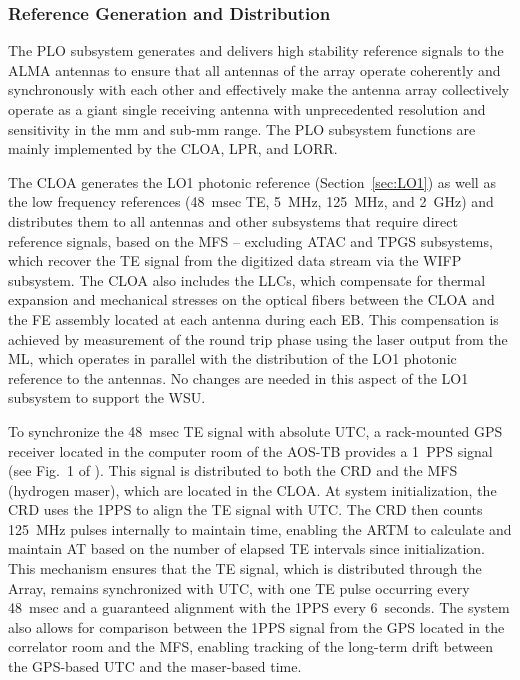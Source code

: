 \subsubsection{Reference Generation and Distribution}
\label{sec:RefGen}

The \ac{PLO} subsystem generates and delivers high stability reference signals to the \ac{ALMA} antennas to ensure that all antennas of the array operate coherently and synchronously with each other and effectively make the antenna array collectively operate as a giant single receiving antenna with unprecedented resolution and sensitivity in the mm and sub-mm range.
The \ac{PLO} subsystem functions are mainly implemented by the \ac{CLOA}, \ac{LPR}, and \ac{LORR}.

The \ac{CLOA} generates the \ac{LO1} photonic reference (Section~\ref{sec:LO1}) as well as the low frequency references (48~msec \ac{TE}, 5~MHz, 125~MHz, and 2~GHz) and distributes them to all antennas and other subsystems that require direct reference signals, based on the \ac{MFS} -- excluding \ac{ATAC} and \ac{TPGS} subsystems, which recover the \ac{TE} signal from the digitized data stream via the \ac{WIFP} subsystem.
The \ac{CLOA} also includes the \acp{LLC}, which compensate for thermal expansion and mechanical stresses on the optical fibers between the \ac{CLOA} and the \ac{FE} assembly located at each antenna during each \ac{EB}.
This compensation is achieved by measurement of the round trip phase using the laser output from the \ac{ML}, which operates in parallel with the distribution of the \ac{LO1} photonic reference to the antennas. 
No changes are needed in this aspect of the \ac{LO1} subsystem to support the \ac{WSU}.

To synchronize the 48~msec \ac{TE} signal with absolute \ac{UTC}, a rack-mounted \ac{GPS} receiver located in the computer room of the \ac{AOS}-TB provides a 1~\ac{PPS} signal (see Fig.~1 of \cite{Timing_alma}). 
This signal is distributed to both the \ac{CRD} and the \ac{MFS} (hydrogen maser), which are located in the \ac{CLOA}.
At system initialization, the \ac{CRD} uses the 1\ac{PPS} to align the \ac{TE} signal with \ac{UTC}.
The \ac{CRD} then counts 125~MHz pulses internally to maintain time, enabling the \ac{ARTM} to calculate and maintain \ac{AT} based on the number of elapsed \ac{TE} intervals since initialization.
This mechanism ensures that the \ac{TE} signal, which is distributed through the Array, remains synchronized with \ac{UTC}, with one \ac{TE} pulse occurring every 48~msec and a guaranteed alignment with the 1\ac{PPS} every 6~seconds.
The system also allows for comparison between the 1\ac{PPS} signal from the \ac{GPS} located in the correlator room and the \ac{MFS}, enabling tracking of the long-term drift between the \ac{GPS}-based UTC and the maser-based time.

